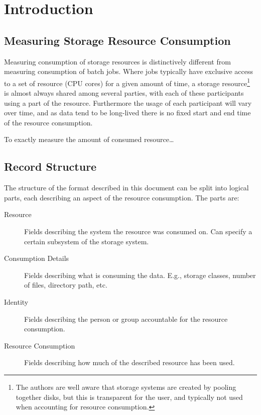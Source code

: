 \section{Introduction}


\subsection{Measuring Storage Resource Consumption}

Measuring consumption of storage resources is distinctively different from
measuring consumption of batch jobs. Where jobs typically have exclusive access
to a set of resource (CPU cores) for a given amount of time, a storage
resource\footnote{The authors are well aware that storage systems are created
by pooling together disks, but this is transparent for the user, and typically
not used when accounting for resource consumption.} is almost always shared
among several parties, with each of these participants using a part of the
resource. Furthermore the usage of each participant will vary over time, and as
data tend to be long-lived there is no fixed start and end time of the resource
consumption.

To exactly measure the amount of consumed resource\ldots



\subsection{Record Structure}

The structure of the format described in this document can be split into
logical parts, each describing an aspect of the resource consumption. The parts
are:

\begin{description}

\item[Resource] Fields describing the system the resource was consumed on. Can
specify a certain subsystem of the storage system.

\item[Consumption Details] Fields describing what is consuming the data. E.g.,
storage classes, number of files, directory path, etc.

\item[Identity] Fields describing the person or group accountable for the
resource consumption.

\item[Resource Consumption] Fields describing how much of the described
resource has been used.

\end{description}

